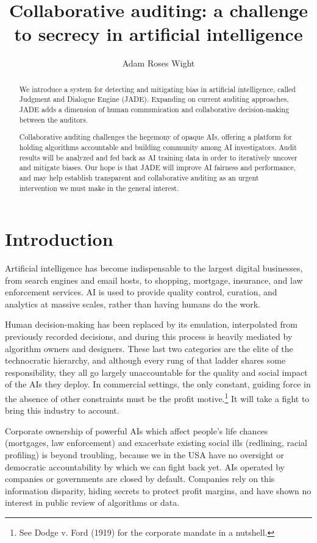 \documentclass[format=sigconf]{acmart}
\title{Collaborative auditing: a challenge to secrecy in artificial intelligence}
\author{Adam Roses Wight}
\affiliation{Wikimedia Foundation}
\begin{document}
\begin{abstract}
We introduce a system for detecting and mitigating bias in artificial intelligence, called Judgment and Dialogue Engine (JADE).  Expanding on current auditing approaches, JADE adds a dimension of human communication and collaborative decision-making between the auditors.

Collaborative auditing challenges the hegemony of opaque AIs, offering a platform for holding algorithms accountable and building community among AI investigators.  Audit results will be analyzed and fed back as AI training data in order to iteratively uncover and mitigate biases.  Our hope is that JADE will improve AI fairness and performance, and may help establish transparent and collaborative auditing as an urgent intervention we must make in the general interest.
\end{abstract}

\maketitle

\section{Introduction}

Artificial intelligence has become indispensable to the largest digital businesses, from search engines and email hosts, to shopping, mortgage, insurance, and law enforcement services.  AI is used to provide quality control, curation, and analytics at massive scales, rather than having humans do the work.

Human decision-making has been replaced by its emulation, interpolated from previously recorded decisions, and during this process is heavily mediated by algorithm owners and designers.  These last two categories are the elite of the technocratic hierarchy, and although every rung of that ladder shares some responsibility, they all go largely unaccountable for the quality and social impact of the AIs they deploy.  In commercial settings, the only constant, guiding force in the absence of other constraints must be the profit motive.\footnote{See Dodge v. Ford (1919) for the corporate mandate in a nutshell.}  It will take a fight to bring this industry to account.

Corporate ownership of powerful AIs which affect people's life chances (mortgages, law enforcement) and exacerbate existing social ills (redlining, racial profiling) is beyond troubling, because we in the USA have no oversight or democratic accountability by which we can fight back yet.  AIs operated by companies or governments are closed by default.  Companies rely on this information disparity, hiding secrets to protect profit margins, and have shown no interest in public review of algorithms or data.
\end{document}
